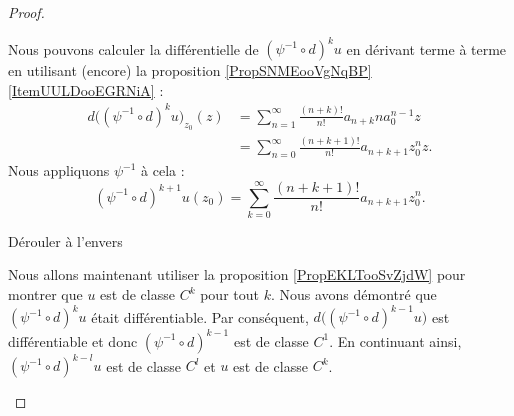 \begin{proof}
\begin{subproof}
        Nous pouvons calculer la différentielle de \( (\psi^{-1}\circ d)^ku\) en dérivant terme à terme en utilisant (encore) la proposition \ref{PropSNMEooVgNqBP}\ref{ItemUULDooEGRNiA} :
        \begin{subequations}
            \begin{align}
                d\big( (\psi^{-1}\circ d)^k u\big)_{z_0}(z)&=\sum_{n=1}^{\infty}\frac{ (n+k)! }{ n! }a_{n+k}na_{0}^{n-1}z\\
                &=\sum_{n=0}^{\infty}\frac{ (n+k+1)! }{ n! }a_{n+k+1}z_{0}^nz.
            \end{align}
        \end{subequations}
        Nous appliquons \( \psi^{-1}\) à cela :
        \begin{equation}
            (\psi^{-1}\circ d)^{k+1}u(z_0)=\sum_{k=0}^{\infty}\frac{ (n+k+1)! }{ n! }a_{n+k+1}z_0^n.
        \end{equation}
        
    \item[Dérouler à l'envers]

        Nous allons maintenant utiliser la proposition \ref{PropEKLTooSvZjdW} pour montrer que \( u\) est de classe \( C^k\) pour tout \( k\). Nous avons démontré que \( (\psi^{-1}\circ d)^ku\) était différentiable. Par conséquent, \( d\big( (\psi^{-1}\circ d)^{k-1}u \big)\) est différentiable et donc \( (\psi^{-1}\circ d)^{k-1}\) est de classe \( C^1\). En continuant ainsi, \( (\psi^{-1}\circ d)^{k-l}u\) est de classe \( C^l\) et \( u\) est de classe \( C^k\).
    \end{subproof}
\end{proof}
